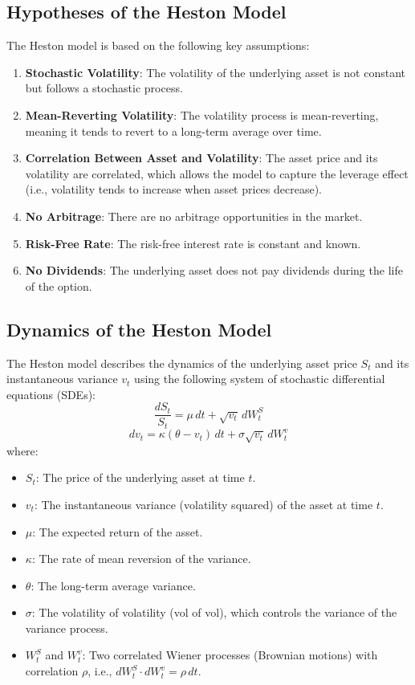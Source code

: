 \documentclass[11pt, oneside, a4paper, titlepage]{report}
\begin{document}
\subsection{Hypotheses of the Heston Model}

The Heston model is based on the following key assumptions:
\begin{enumerate}
    \item \textbf{Stochastic Volatility}: The volatility of the underlying asset is not constant but follows a stochastic process.
    \item \textbf{Mean-Reverting Volatility}: The volatility process is mean-reverting, meaning it tends to revert to a long-term average over time.
    \item \textbf{Correlation Between Asset and Volatility}: The asset price and its volatility are correlated, which allows the model to capture the leverage effect (i.e., volatility tends to increase when asset prices decrease).
    \item \textbf{No Arbitrage}: There are no arbitrage opportunities in the market.
    \item \textbf{Risk-Free Rate}: The risk-free interest rate is constant and known.
    \item \textbf{No Dividends}: The underlying asset does not pay dividends during the life of the option.
\end{enumerate}

\subsection{Dynamics of the Heston Model}

The Heston model describes the dynamics of the underlying asset price \( S_t \) and its instantaneous variance \( v_t \) using the following system of stochastic differential equations (SDEs):
\[
\frac{dS_t}{S_t} = \mu \, dt + \sqrt{v_t} \, dW_t^S
\]
\[
dv_t = \kappa (\theta - v_t) \, dt + \sigma \sqrt{v_t} \, dW_t^v
\]
where:
\begin{itemize}
    \item \( S_t \): The price of the underlying asset at time \( t \).
    \item \( v_t \): The instantaneous variance (volatility squared) of the asset at time \( t \).
    \item \( \mu \): The expected return of the asset.
    \item \( \kappa \): The rate of mean reversion of the variance.
    \item \( \theta \): The long-term average variance.
    \item \( \sigma \): The volatility of volatility (vol of vol), which controls the variance of the variance process.
    \item \( W_t^S \) and \( W_t^v \): Two correlated Wiener processes (Brownian motions) with correlation \( \rho \), i.e., \( dW_t^S \cdot dW_t^v = \rho \, dt \).
\end{itemize}
\end{document}
